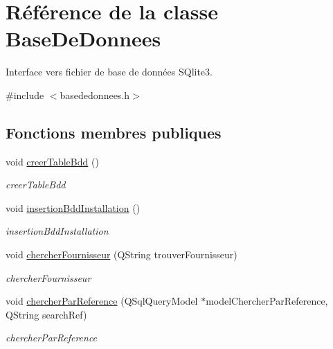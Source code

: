\hypertarget{class_base_de_donnees}{}\section{Référence de la classe Base\+De\+Donnees}
\label{class_base_de_donnees}


Interface vers fichier de base de données S\+Qlite3.  




{\ttfamily \#include $<$basededonnees.\+h$>$}

\subsection*{Fonctions membres publiques}
\begin{DoxyCompactItemize}
\item 
\mbox{\label{class_base_de_donnees_a888c0084f35395cc2aaae8326a27af06}} 
void \mbox{\hyperlink{class_base_de_donnees_a888c0084f35395cc2aaae8326a27af06}{creer\+Table\+Bdd}} ()
\begin{DoxyCompactList}\small\item\em creer\+Table\+Bdd \end{DoxyCompactList}\item 
\mbox{\label{class_base_de_donnees_a635a8df387997ad54a4bcc4b8bce1a78}} 
void \mbox{\hyperlink{class_base_de_donnees_a635a8df387997ad54a4bcc4b8bce1a78}{insertion\+Bdd\+Installation}} ()
\begin{DoxyCompactList}\small\item\em insertion\+Bdd\+Installation \end{DoxyCompactList}\item 
void \mbox{\hyperlink{class_base_de_donnees_aaff06392cdd1aa3e3e66f1bb8214d1fb}{chercher\+Fournisseur}} (Q\+String trouver\+Fournisseur)
\begin{DoxyCompactList}\small\item\em chercher\+Fournisseur \end{DoxyCompactList}\item 
void \mbox{\hyperlink{class_base_de_donnees_aaa4a62ca5864ce24cb0b3d488a609811}{chercher\+Par\+Reference}} (Q\+Sql\+Query\+Model $\ast$model\+Chercher\+Par\+Reference, Q\+String search\+Ref)
\begin{DoxyCompactList}\small\item\em chercher\+Par\+Reference \end{DoxyCompactList}\item 

\end{DoxyCompactItemize}
